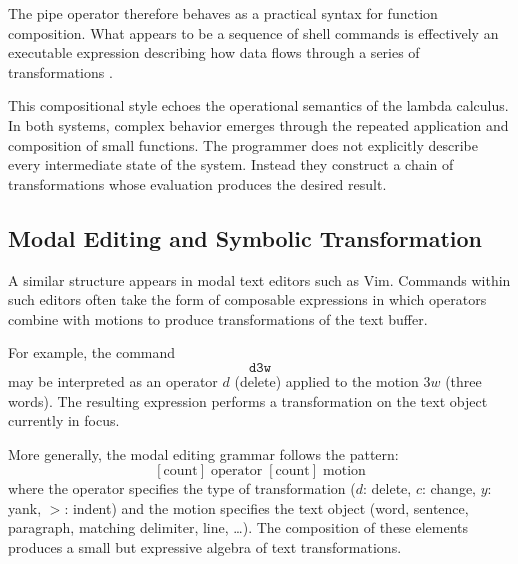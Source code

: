 \documentclass[12pt]{article}
\theoremstyle{definition}
\begin{document}
The pipe operator therefore behaves as a practical syntax for function
composition. What appears to be a sequence of shell commands is
effectively an executable expression describing how data flows through
a series of transformations \cite{fant2006}.

This compositional style echoes the operational semantics of the lambda
calculus. In both systems, complex behavior emerges through the repeated
application and composition of small functions. The programmer does not
explicitly describe every intermediate state of the system. Instead they
construct a chain of transformations whose evaluation produces the
desired result.

\subsection{Modal Editing and Symbolic Transformation}

A similar structure appears in modal text editors such as Vim. Commands
within such editors often take the form of composable expressions in
which operators combine with motions to produce transformations of the
text buffer.

For example, the command
\[
\texttt{d3w}
\]
may be interpreted as an operator $d$ (delete) applied to the motion
$3w$ (three words). The resulting expression performs a transformation
on the text object currently in focus.

More generally, the modal editing grammar follows the pattern:
\[
[\text{count}]\;\text{operator}\;[\text{count}]\;\text{motion}
\]
where the operator specifies the type of transformation ($d$: delete,
$c$: change, $y$: yank, $>$: indent) and the motion specifies the text
object (word, sentence, paragraph, matching delimiter, line, \ldots).
The composition of these elements produces a small but expressive
algebra of text transformations.
\end{document}
